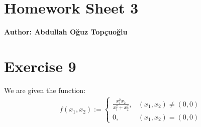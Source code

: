 \documentclass{article}
\begin{document}
\section*{\huge Homework Sheet 3}
\begin{flushright}
   \textbf{Author: Abdullah Oğuz Topçuoğlu}
\end{flushright}


\section*{Exercise 9}
We are given the function:
\begin{align*}
   f(x_1, x_2) :=
   \begin{cases}
      \frac{x_1^2 x_2}{x_1^2 + x_2^2}, & (x_1, x_2) \neq (0, 0) \\
      0,                               & (x_1, x_2) = (0, 0)
   \end{cases}
\end{align*}
\end{document}
